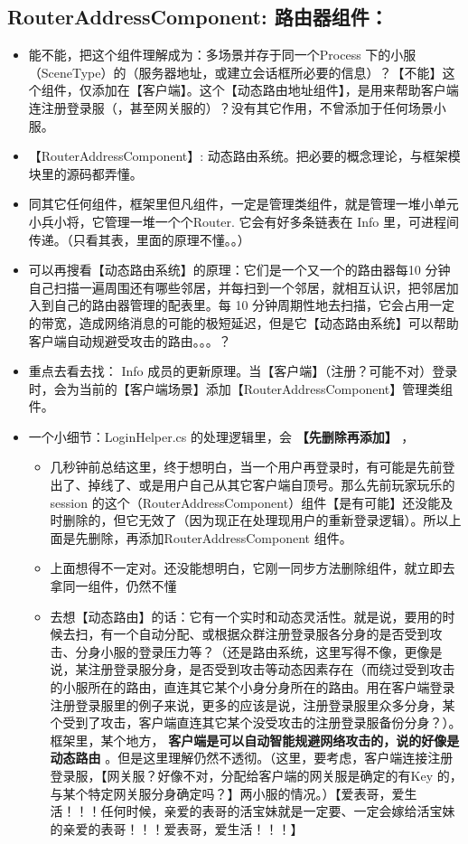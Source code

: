\documentclass[9pt, b5paper]{article}
\begin{document}
\subsection{RouterAddressComponent: 路由器组件：}
\label{sec:orgc367594}
\begin{itemize}
\item 能不能，把这个组件理解成为：多场景并存于同一个Process 下的小服（SceneType）的（服务器地址，或建立会话框所必要的信息）？【不能】这个组件，仅添加在【客户端】。这个【动态路由地址组件】，是用来帮助客户端连注册登录服（，甚至网关服的）？没有其它作用，不曾添加于任何场景小服。
\item 【RouterAddressComponent】: 动态路由系统。把必要的概念理论，与框架模块里的源码都弄懂。
\item 同其它任何组件，框架里但凡组件，一定是管理类组件，就是管理一堆小单元小兵小将，它管理一堆一个个Router. 它会有好多条链表在 Info 里，可进程间传递。（只看其表，里面的原理不懂。。）
\item 可以再搜看【动态路由系统】的原理：它们是一个又一个的路由器每10 分钟自己扫描一遍周围还有哪些邻居，并每扫到一个邻居，就相互认识，把邻居加入到自己的路由器管理的配表里。每 10 分钟周期性地去扫描，它会占用一定的带宽，造成网络消息的可能的极短延迟，但是它【动态路由系统】可以帮助客户端自动规避受攻击的路由。。。？
\item 重点去看去找： Info 成员的更新原理。当【客户端】（注册？可能不对）登录时，会为当前的【客户端场景】添加【RouterAddressComponent】管理类组件。
\item 一个小细节：LoginHelper.cs 的处理逻辑里，会 \textbf{【先删除再添加】} ，
\begin{itemize}
\item 几秒钟前总结这里，终于想明白，当一个用户再登录时，有可能是先前登出了、掉线了、或是用户自己从其它客户端自顶号。那么先前玩家玩乐的 session 的这个（RouterAddressComponent）组件【是有可能】还没能及时删除的，但它无效了（因为现正在处理现用户的重新登录逻辑）。所以上面是先删除，再添加RouterAddressComponent 组件。
\item 上面想得不一定对。还没能想明白，它刚一同步方法删除组件，就立即去拿同一组件，仍然不懂
\item 去想【动态路由】的话：它有一个实时和动态灵活性。就是说，要用的时候去扫，有一个自动分配、或根据众群注册登录服各分身的是否受到攻击、分身小服的登录压力等？（还是路由系统，这里写得不像，更像是说，某注册登录服分身，是否受到攻击等动态因素存在（而绕过受到攻击的小服所在的路由，直连其它某个小身分身所在的路由。用在客户端登录注册登录服里的例子来说，更多的应该是说，注册登录服里众多分身，某个受到了攻击，客户端直连其它某个没受攻击的注册登录服备份分身？）。框架里，某个地方， \textbf{客户端是可以自动智能规避网络攻击的，说的好像是动态路由} 。但是这里理解仍然不透彻。（这里，要考虑，客户端连接注册登录服，【网关服？好像不对，分配给客户端的网关服是确定的有Key 的，与某个特定网关服分身确定吗？】两小服的情况。）【爱表哥，爱生活！！！任何时候，亲爱的表哥的活宝妹就是一定要、一定会嫁给活宝妹的亲爱的表哥！！！爱表哥，爱生活！！！】

\end{itemize}
\end{itemize}
\end{document}
